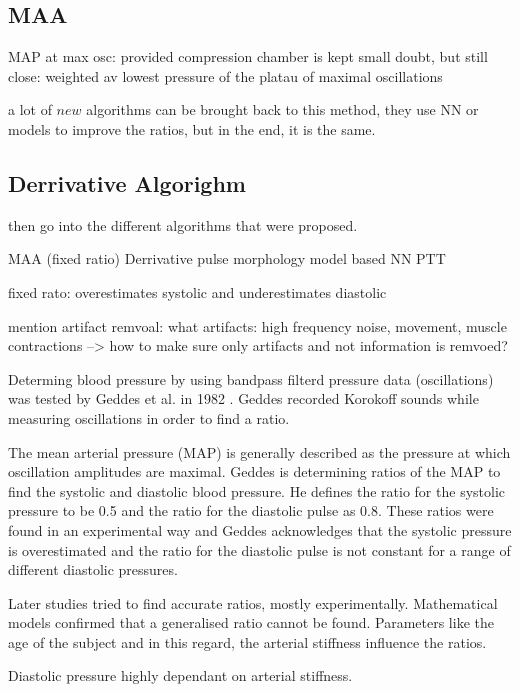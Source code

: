 \subsection{MAA}


MAP at max osc:\cite{Geddes1982,Drzewiecki1994,Babbs2012}\cite{Ramsey1979} provided compression chamber is kept small \cite{Mauck1980}
doubt, but still close: weighted av\cite{Chandrasekhar2019}
lowest pressure of the platau of maximal oscillations \cite{Ursino1996}


a lot of $new$ algorithms can be brought back to this method, they use NN or models to improve the ratios, but in the end, it is the same.
\subsection{Derrivative Algorighm}
then go into the different algorithms that were proposed.


MAA (fixed ratio)
Derrivative
pulse morphology
model based
NN
PTT

\cite{Chandrasekhar2019}
fixed rato: overestimates systolic and underestimates diastolic

mention artifact remvoal:
what artifacts: high frequency noise, movement, muscle contractions
 --> how to make sure only artifacts and not information is remvoed?


Determing blood pressure by using bandpass filterd pressure data (oscillations) was tested by Geddes et al. in 1982 \cite{Geddes1982}. Geddes recorded Korokoff sounds while measuring oscillations in order to find a ratio.

The mean arterial pressure (MAP) is generally described as the pressure at which oscillation amplitudes are maximal. Geddes is determining ratios of the MAP to find the systolic and diastolic blood pressure. He defines the ratio for the systolic pressure to be 0.5 and the ratio for the diastolic pulse as 0.8. These ratios were found in an experimental way and Geddes acknowledges that the systolic pressure is overestimated and the ratio for the diastolic pulse is not constant for a range of different diastolic pressures.

Later studies tried to find accurate ratios, mostly experimentally. Mathematical models confirmed that a generalised ratio cannot be found. Parameters like the age of the subject and in this regard, the arterial stiffness influence the ratios. \cite{Babbs2012}

Diastolic pressure highly dependant on arterial stiffness. \cite{Babbs2012}



